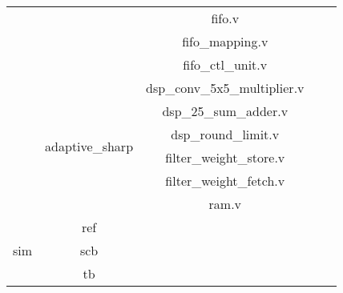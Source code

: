 \begin{table}[h]
\begin{tabular}{|c|c|c|ll}
                          &                                       & fifo.v                              &  &  \\ \cline{3-3}
                          &                                       & fifo\_mapping.v                     &  &  \\ \cline{3-3}
                          &                                       & fifo\_ctl\_unit.v                   &  &  \\ \cline{2-3}
                          & \multirow{6}{*}{adaptive\_sharp}      & dsp\_conv\_5x5\_multiplier.v        &  &  \\ \cline{3-3}
                          &                                       & dsp\_25\_sum\_adder.v               &  &  \\ \cline{3-3}
                          &                                       & dsp\_round\_limit.v                 &  &  \\ \cline{3-3}
                          &                                       & filter\_weight\_store.v             &  &  \\ \cline{3-3}
                          &                                       & filter\_weight\_fetch.v             &  &  \\ \cline{3-3}
                          &                                       & ram.v                               &  &  \\ \cline{1-3}
    \multirow{3}{*}{sim}  & ref                                   &                                     &  &  \\ \cline{2-3}
                          & scb                                   &                                     &  &  \\ \cline{2-3}
                          & tb                                    &                                     &  &  \\ \cline{1-3}
    \end{tabular}
    \end{table}